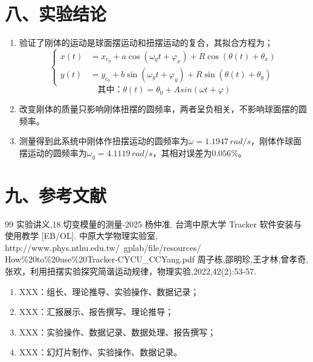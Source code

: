 \documentclass[11pt]{article}
\begin{document}
\section*{八、实验结论}
\begin{enumerate}
    \item 验证了刚体的运动是球面摆运动和扭摆运动的复合，其拟合方程为；
        $$\left\{
        \begin{aligned}
            x(t)&=x_{c_0}+a\cos(\omega_{g}t+\varphi_x)+R\cos(\theta(t)+\theta_x) \\
            y(t)&=y_{c_0}+b\sin(\omega_{g}t+\varphi_y)+R\sin(\theta(t)+\theta_y)
        \end{aligned}
        \right.$$
        $$
        \text{其中：}\theta(t)=\theta_0+Asin(\omega t+\varphi)
        $$
    \item 改变刚体的质量只影响刚体扭摆的圆频率，两者呈负相关，不影响球面摆的圆频率。
    \item 测量得到此系统中刚体作扭摆运动的圆频率为$\omega=1.1947\,rad/s$，刚体作球面摆运动的圆频率为$\omega_g=4.1119\,rad/s$，其相对误差为$0.056\%$。
\end{enumerate}

\section*{九、参考文献}

\begingroup  %
\renewcommand{\section}[2]{} 
\begin{thebibliography}{99}
     实验讲义,18.切变模量的测量-2025
     杨仲准. 台湾中原大学 Tracker 软件安装与使用教学 [EB/OL]. 中原大学物理实验室, \\ http://www.phys.nthu.edu.tw/~gplab/file/resources/\\How\%20to\%20use\%20Tracker-CYCU\_CCYang.pdf
     周子栋,邵明珍,王才林,曾孝奇,张欢，利用扭摆实验探究简谐运动规律，物理实验,2022,42(2):53-57.
\end{thebibliography}
\endgroup

\section*{十、小组分工}

\begin{enumerate}
    \item XXX：组长、理论推导、实验操作、数据记录；
    \item XXX：汇报展示、报告撰写、理论推导；
    \item XXX：实验操作、数据记录、数据处理、报告撰写；
    \item XXX：幻灯片制作、实验操作、数据记录。
\end{enumerate}
\end{document}
